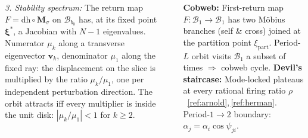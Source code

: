 \documentclass[25pt, a0paper, portrait, margin=15mm, innermargin=15mm,
               blockverticalspace=12mm, colspace=12mm, subcolspace=8mm]{tikzposter}
\newcommand{\vv}[1]{\mathbf{#1}}
\newcommand{\xxi}{\boldsymbol{\xi}}
\newcommand{\Bsp}{\mathcal{B}}
\begin{document}
\begin{columns}
{\begin{minipage}[t]{\linewidth}
\emph{3. Stability spectrum:} The return map $F=\mathrm{dh}\circ\vv{M}_\sigma$ on $\Bsp_{b_0}$ has, at its fixed point $\xxi^*$, a Jacobian with $N{-}1$ eigenvalues. Numerator $\mu_k$ along a transverse eigenvector $\vv{v}_k$, denominator $\mu_1$ along the fixed ray: the displacement on the slice is multiplied by the ratio $\mu_k/\mu_1$, one per independent perturbation direction. The orbit attracts iff every multiplier is inside the unit disk: $|\mu_k/\mu_1|<1$ for $k\ge 2$.
\noindent\rule{\linewidth}{0.4pt}

\textbf{Cobweb:} First-return map $F:\Bsp_1\to\Bsp_1$ has two M\"obius branches (self \& cross) joined at the partition point $\xi_{\mathrm{part}}$. Period-$L$ orbit visits $\Bsp_1$ a subset of times $\Rightarrow$ cobweb cycle. \textbf{Devil's staircase:} Mode-locked plateaus at every rational firing ratio $\rho$~\ref{ref:arnold},\,\ref{ref:herman}. Period-$1\to 2$ boundary: $\alpha_j = \alpha_i\cos\psi_{ji}$.
\end{minipage}
\vspace{1.2mm}
}
\end{columns}
\end{document}
